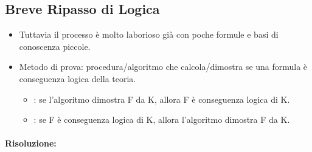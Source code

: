 \subsection{Breve Ripasso di Logica}



\begin{itemize}
  \item Tuttavia il processo è molto laborioso già con poche formule e basi di conoscenza piccole. 
  \item Metodo di prova: procedura/algoritmo che calcola/dimostra se una formula è
conseguenza logica della teoria. 
\begin{itemize}
  \item {}: se l’algoritmo dimostra F da K, allora F è
conseguenza logica di K. 
\item {}: se F è conseguenza logica di K, allora l’algoritmo
dimostra F da K.
\end{itemize}
\end{itemize}

\paragraph{Risoluzione:}

